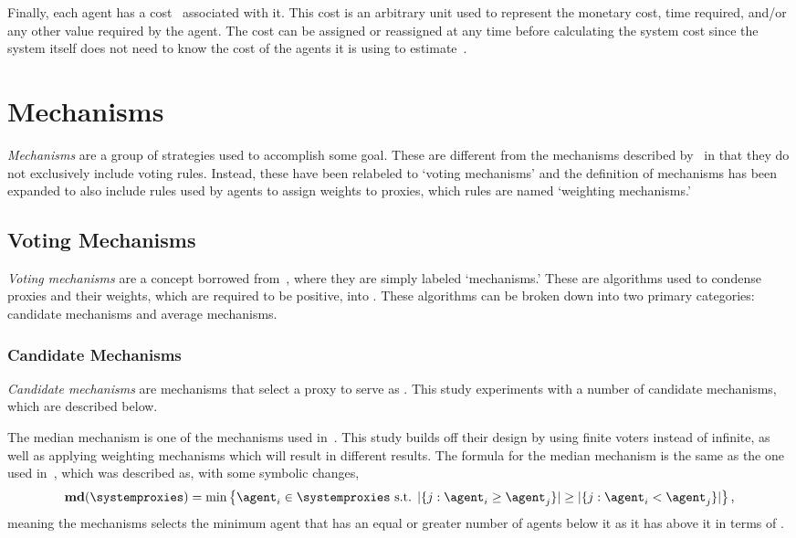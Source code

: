 Finally, each agent has a cost \agentcost\ associated with it.
This cost is an arbitrary unit used to represent the monetary cost, time
required, and/or any other value required by the agent.
The cost can be assigned or reassigned at any time before calculating the
system cost since the system itself does not need to know the cost of the
agents it is using to estimate~\truth.



\section{Mechanisms}\label{sec:mechanisms}
\textit{Mechanisms} are a group of strategies used to accomplish some goal.
These are different from the mechanisms described by~\cite{Cohensius2017} in
that they do not exclusively include voting rules.
Instead, these have been relabeled to `voting mechanisms' and the definition
of mechanisms has been expanded to also include rules used by agents to
assign weights to proxies, which rules are named `weighting mechanisms.'

\subsection{Voting Mechanisms}\label{subsec:voting-mechanisms}
\textit{Voting mechanisms} are a concept borrowed from~\cite{Cohensius2017},
where they are simply labeled `mechanisms.'
These are algorithms used to condense proxies and their weights, which are
required to be positive, into \systemtruth.
These algorithms can be broken down into two primary categories: candidate
mechanisms and average mechanisms.

\subsubsection{Candidate Mechanisms}\label{subsubsec:candidate-mechanisms}
\textit{Candidate mechanisms} are mechanisms that select a proxy to serve as
\systemtruth.
This study experiments with a number of candidate mechanisms, which are
described below.

\label{para:median}
The median mechanism is one of the mechanisms used in~\cite{Cohensius2017}.
This study builds off their design by using finite voters instead of
infinite, as well as applying weighting mechanisms which will result in
different results.
The formula for the median mechanism is the same as the one used
in~\cite[para.~2.4]{Cohensius2017}, which was described as, with some
symbolic changes,
\begin{equation*}
    \textbf{md}(\systemproxies) =
    \min\left\{\agent_i \in \systemproxies \text{ s.t. }
    |\{j: \agent_i \geq \agent_j\}| \geq
    |\{j: \agent_i < \agent_j\}|
    \right\}
    \text{,}
\end{equation*}
meaning the mechanisms selects the minimum agent that has an equal or greater
number of agents below it as it has above it in terms of \agenttruth.

